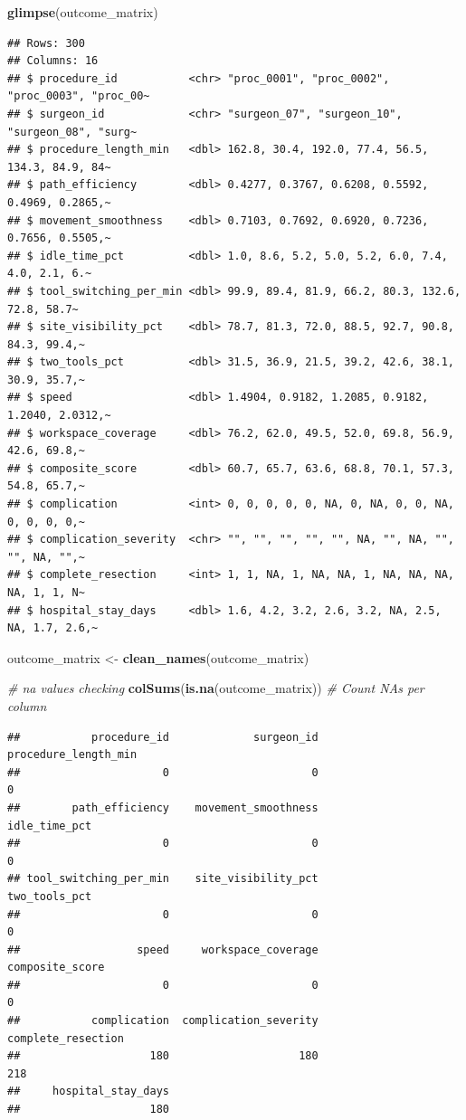 \documentclass[
]{article}
\newenvironment{Shaded}{\begin{snugshade}}{\end{snugshade}}
\newcommand{\CommentTok}[1]{\textcolor[rgb]{0.56,0.35,0.01}{\textit{#1}}}
\newcommand{\FunctionTok}[1]{\textcolor[rgb]{0.13,0.29,0.53}{\textbf{#1}}}
\newcommand{\NormalTok}[1]{#1}
\newcommand{\OtherTok}[1]{\textcolor[rgb]{0.56,0.35,0.01}{#1}}
\begin{document}
\begin{Shaded}
\begin{Highlighting}[]
\FunctionTok{glimpse}\NormalTok{(outcome\_matrix)}
\end{Highlighting}
\end{Shaded}

\begin{verbatim}
## Rows: 300
## Columns: 16
## $ procedure_id           <chr> "proc_0001", "proc_0002", "proc_0003", "proc_00~
## $ surgeon_id             <chr> "surgeon_07", "surgeon_10", "surgeon_08", "surg~
## $ procedure_length_min   <dbl> 162.8, 30.4, 192.0, 77.4, 56.5, 134.3, 84.9, 84~
## $ path_efficiency        <dbl> 0.4277, 0.3767, 0.6208, 0.5592, 0.4969, 0.2865,~
## $ movement_smoothness    <dbl> 0.7103, 0.7692, 0.6920, 0.7236, 0.7656, 0.5505,~
## $ idle_time_pct          <dbl> 1.0, 8.6, 5.2, 5.0, 5.2, 6.0, 7.4, 4.0, 2.1, 6.~
## $ tool_switching_per_min <dbl> 99.9, 89.4, 81.9, 66.2, 80.3, 132.6, 72.8, 58.7~
## $ site_visibility_pct    <dbl> 78.7, 81.3, 72.0, 88.5, 92.7, 90.8, 84.3, 99.4,~
## $ two_tools_pct          <dbl> 31.5, 36.9, 21.5, 39.2, 42.6, 38.1, 30.9, 35.7,~
## $ speed                  <dbl> 1.4904, 0.9182, 1.2085, 0.9182, 1.2040, 2.0312,~
## $ workspace_coverage     <dbl> 76.2, 62.0, 49.5, 52.0, 69.8, 56.9, 42.6, 69.8,~
## $ composite_score        <dbl> 60.7, 65.7, 63.6, 68.8, 70.1, 57.3, 54.8, 65.7,~
## $ complication           <int> 0, 0, 0, 0, 0, NA, 0, NA, 0, 0, NA, 0, 0, 0, 0,~
## $ complication_severity  <chr> "", "", "", "", "", NA, "", NA, "", "", NA, "",~
## $ complete_resection     <int> 1, 1, NA, 1, NA, NA, 1, NA, NA, NA, NA, 1, 1, N~
## $ hospital_stay_days     <dbl> 1.6, 4.2, 3.2, 2.6, 3.2, NA, 2.5, NA, 1.7, 2.6,~
\end{verbatim}

\begin{Shaded}
\begin{Highlighting}[]
\NormalTok{outcome\_matrix }\OtherTok{\textless{}{-}} \FunctionTok{clean\_names}\NormalTok{(outcome\_matrix)}

\CommentTok{\# na values checking }
\FunctionTok{colSums}\NormalTok{(}\FunctionTok{is.na}\NormalTok{(outcome\_matrix)) }\CommentTok{\# Count NAs per column}
\end{Highlighting}
\end{Shaded}

\begin{verbatim}
##           procedure_id             surgeon_id   procedure_length_min 
##                      0                      0                      0 
##        path_efficiency    movement_smoothness          idle_time_pct 
##                      0                      0                      0 
## tool_switching_per_min    site_visibility_pct          two_tools_pct 
##                      0                      0                      0 
##                  speed     workspace_coverage        composite_score 
##                      0                      0                      0 
##           complication  complication_severity     complete_resection 
##                    180                    180                    218 
##     hospital_stay_days 
##                    180
\end{verbatim}
\end{document}
